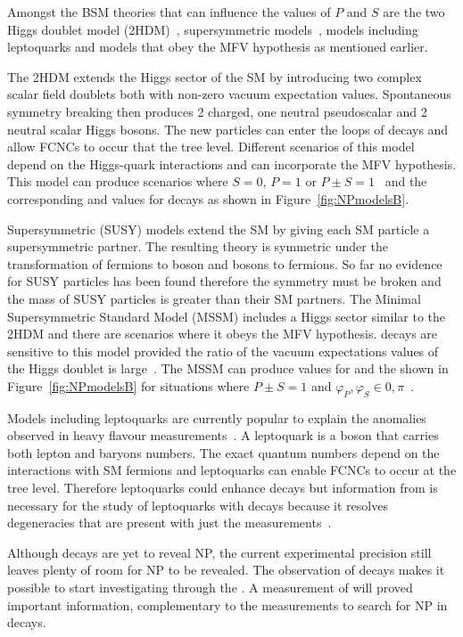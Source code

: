 Amongst the BSM theories that can influence the values of $P$ and $S$ are the two Higgs doublet model (2HDM)~\cite{HALL1981397}, supersymmetric models~\cite{Witten:1981nf}, models including leptoquarks and models that obey the MFV hypothesis as mentioned earlier.

The 2HDM extends the Higgs sector of the SM by introducing two complex scalar field doublets both with non-zero vacuum expectation values. Spontaneous symmetry breaking then produces 2 charged, one neutral pseudoscalar and 2 neutral scalar Higgs bosons. The new particles can enter the loops of \bmumu decays and allow FCNCs to occur that the tree level. Different scenarios of this model depend on the Higgs-quark interactions and can incorporate the MFV hypothesis. This model can produce scenarios where $S=0$, $P=1$ or $P\pm S = 1$~\cite{Buras:2013uqa,Knegjens:2014zva} and the corresponding \BF and \ADG values for \bsmumu decays as shown in Figure~\ref{fig:NPmodelsB}.

Supersymmetric (SUSY) models extend the SM by giving each SM particle a supersymmetric partner. The resulting theory is symmetric under the transformation of fermions to boson and bosons to fermions. So far no evidence for SUSY particles has been found therefore the symmetry must be broken and the mass of SUSY particles is greater than their SM partners. The Minimal Supersymmetric Standard Model (MSSM) includes a Higgs sector similar to the 2HDM and there are scenarios where it obeys the MFV hypothesis. \bmumu decays are sensitive to this model provided the ratio of the vacuum expectations values of the Higgs doublet is large~\cite{Babu:1999hn,Isidori:2001fv,Buras:2002vd}. The MSSM can produce values for \ADG and the \bsmumu \BF shown in Figure~\ref{fig:NPmodelsB} for situations where $P\pm S =1$ and $\varphi_P, \varphi_S \in {0, \pi}$~\cite{Buras:2013uqa,Knegjens:2014zva}.

Models including leptoquarks are currently popular to explain the anomalies observed in heavy flavour measurements~\cite{Barbieri:2016las,Becirevic:2016yqi,Hiller:2014yaa,Bauer:2015knc,Fajfer:2015ycq}. A leptoquark is a boson that carries both lepton and baryons numbers. The exact quantum numbers depend on the interactions with SM fermions and leptoquarks can enable FCNCs to occur at the tree level. Therefore leptoquarks could enhance \bmumu decays but information from \ADG is necessary for the study of leptoquarks with \bmumu decays because it resolves degeneracies that are present with just the \BF measurements~\cite{Altmannshofer:2017wqy}.

Although \bmumu decays are yet to reveal NP, the current experimental precision still leaves plenty of room for NP to be revealed. The observation of \bsmumu decays makes it possible to start investigating \ADG through the \bsmumu \el. A measurement of \ADG will proved important information, complementary to the \bmumu \BF measurements to search for NP in \bsmumu decays.

